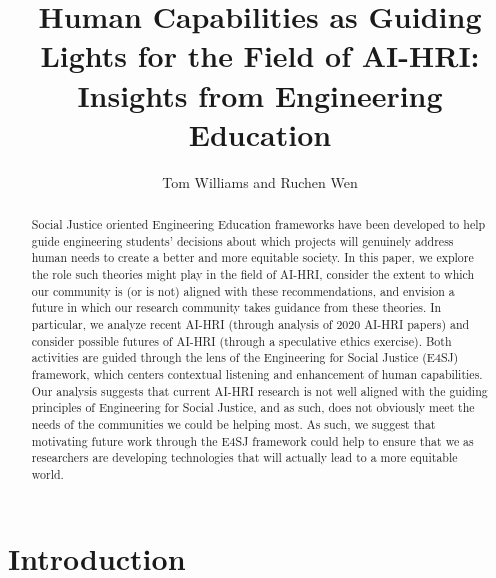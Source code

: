 \documentclass[letterpaper]{article} %
\title{Human Capabilities as Guiding Lights for the Field of AI-HRI:\\ Insights from Engineering Education}
\author {
Tom Williams and Ruchen Wen\\
}
\begin{document}
\maketitle

\begin{abstract}
Social Justice oriented Engineering Education frameworks have been developed to help guide engineering students' decisions about which projects will genuinely address human needs to create a better and more equitable society.
In this paper, we explore the role such theories might play in the field of AI-HRI,
consider the extent to which our community is (or is not) aligned with these recommendations, and envision a future in which our research community takes guidance from these
theories. In particular, we analyze recent AI-HRI (through analysis of 2020 AI-HRI papers) and consider possible  futures of AI-HRI (through a speculative ethics exercise). Both activities are guided through the lens of the Engineering for Social Justice (E4SJ) framework, which centers contextual listening and enhancement of human capabilities. Our analysis suggests that current AI-HRI research is not well aligned with the  guiding principles of Engineering for Social Justice, and as such, does not obviously meet the needs of the communities we could be helping most. As such, we suggest that motivating future work through the E4SJ framework could help to ensure that we as researchers are developing technologies that will actually lead to a more equitable world.
\end{abstract}

\section{Introduction}
\end{document}
